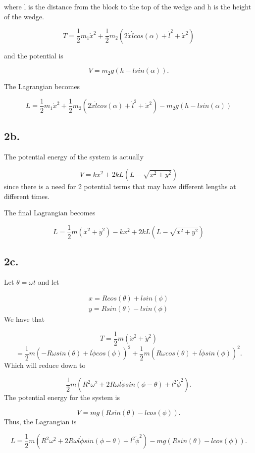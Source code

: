 \documentclass[12pt]{article}
\begin{document}
where l is the distance from the block to the top of the wedge and h is the height of the wedge. 

$$
T = \frac{1}{2}m_{1}\dot{x}^{2} + \frac{1}{2}m_{2}(2\dot{x}\dot{l}cos(\alpha) + \dot{l}^{2} + \dot{x}^{2})
$$

and the potential is

$$
V = m_{2}g(h - lsin(\alpha)).
$$

The Lagrangian becomes

$$
L = \frac{1}{2}m_{1}\dot{x}^{2} + \frac{1}{2}m_{2}(2\dot{x}\dot{l}cos(\alpha) + \dot{l}^{2} + \dot{x}^{2}) - m_{2}g(h - lsin(\alpha))
$$


\subsection*{2b.}
\noindent
The potential energy of the system is actually 

$$
V = kx^{2} + 2kL(L - \sqrt{x^{2} + y^{2}})
$$
\noindent
since there is a need for 2 potential terms that may have different lengths at different times.

\noindent
The final Lagrangian becomes

$$
L = \frac{1}{2}m(\dot{x}^{2} + \dot{y}^{2}) - kx^{2} + 2kL(L - \sqrt{x^{2} + y^{2}})
$$

\subsection*{2c.}
\noindent
Let $\theta = \omega t$ and let 

\begin{align}
x = Rcos(\theta) + lsin(\phi) \\
y = Rsin(\theta) - lsin(\phi)
\end{align}
\noindent
We have that 

$$
T = \frac{1}{2}m(\dot{x}^{2} + \dot{y}^{2}) 
$$
$$
=\frac{1}{2}m(-R\omega sin(\theta) + l\dot{\phi}cos(\phi))^{2} + \frac{1}{2}m(R\omega cos(\theta) + l\dot{\phi}sin(\phi))^{2}.
$$
\noindent
Which will reduce down to 

$$
\frac{1}{2}m(R^{2}\omega^{2} + 2R\omega l \dot{\phi}sin(\phi - \theta) + l^{2}\dot{\phi}^{2}).
$$
\noindent
The potential energy for the system is 

$$
V = mg(Rsin(\theta) - lcos(\phi)).
$$
\noindent
Thus, the Lagrangian is 

$$
L = \frac{1}{2}m(R^{2}\omega^{2} + 2R\omega l \dot{\phi}sin(\phi - \theta) + l^{2}\dot{\phi}^{2}) - mg(Rsin(\theta) - lcos(\phi)).
$$
\end{document}
